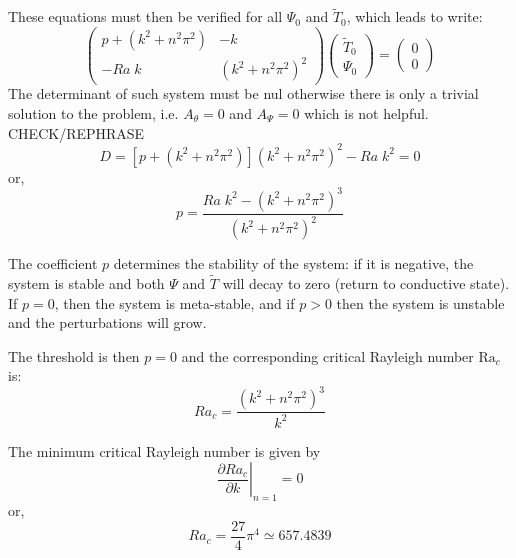  
These equations must then be verified for all $\Psi_0$ and $\tilde{T}_0$, 
which leads to write:
\[
\left(
\begin{array}{cc}
p + (k^2+n^2\pi^2) & -k \\
-Ra \; k & (k^2+n^2\pi^2)^2 
\end{array}
\right)
\left(
\begin{array}{c}
\tilde{T}_0 \\ \Psi_0
\end{array}
\right)
=
\left(
\begin{array}{c}
0 \\ 0
\end{array}
\right)
\]
The determinant of such system must be nul otherwise there is only a trivial solution to the problem, i.e. $A_\theta=0$ and $A_\Psi=0$ which is not helpful. CHECK/REPHRASE
\[
D= [p + (k^2+n^2\pi^2)](k^2+n^2\pi^2)^2 - Ra \; k^2 =0
\]
or, 
\[
p = \frac{Ra \; k^2 -(k^2+n^2\pi^2)^3 }{ (k^2+n^2\pi^2)^2}
\]

The coefficient $p$ determines the stability of the system: if it is negative, 
the system is stable and both $\Psi$ and $\tilde{T}$ will decay to zero (return to conductive state). 
If $p=0$, then the system is meta-stable, and if $p>0$ then the system is unstable and 
the perturbations will grow. 

The threshold is then $p=0$ and the corresponding critical Rayleigh number $\text{Ra}_c$ is:
\[
Ra_c=\frac{(k^2+n^2\pi^2)^3}{k^2}
\]

The minimum critical Rayleigh number is given by 
\[
\left. \frac{\partial Ra_c}{\partial k}\right|_{n=1}=0
\]
or, 
\[
Ra_c = \frac{27}{4}\pi^4 \simeq 657.4839
\]



